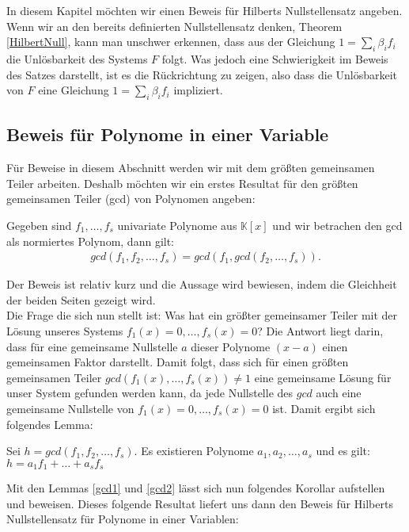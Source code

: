 In diesem Kapitel möchten wir einen Beweis für Hilberts Nullstellensatz angeben.
Wenn wir an den bereits definierten Nullstellensatz denken, Theorem \ref{HilbertNull}, kann man unschwer erkennen, dass aus der Gleichung $1 = \sum_i \beta_if_i$ die Unlösbarkeit des Systems $F$ folgt. Was jedoch eine Schwierigkeit im Beweis des Satzes darstellt, ist es die Rückrichtung zu zeigen, also dass die Unlösbarkeit von $F$ eine Gleichung $1 = \sum_i \beta_if_i$ impliziert.

\subsection{Beweis für Polynome in einer Variable}

Für Beweise in diesem Abschnitt werden wir mit dem größten gemeinsamen Teiler arbeiten. Deshalb möchten wir ein erstes Resultat für den größten gemeinsamen Teiler (gcd) von Polynomen angeben:
\begin{lemma} \label{gcd1}
Gegeben sind $f_1,\ldots ,f_s$ univariate Polynome aus $\mathbb{K}[x]$ und wir betrachen den gcd als normiertes Polynom, dann gilt:
\begin{align*}
gcd (f_1,f_2,\ldots,f_s) = gcd(f_1,gcd(f_2,\ldots,f_s)).
\end{align*}
\end{lemma}

\noindent Der Beweis ist relativ kurz und die Aussage wird bewiesen, indem die Gleichheit der beiden Seiten gezeigt wird.\\
\noindent Die Frage die sich nun stellt ist: Was hat ein größter gemeinsamer Teiler mit der Lösung unseres Systems $f_1(x)=0,\ldots,f_s(x)=0$? Die Antwort liegt darin, dass für eine gemeinsame Nullstelle $a$ dieser Polynome $(x-a)$ einen gemeinsamen Faktor darstellt. Damit folgt, dass sich für einen größten gemeinsamen Teiler $gcd(f_1(x),\ldots,f_s(x)) \not = 1$ eine gemeinsame Lösung für unser System gefunden werden kann, da jede Nullstelle des $gcd$ auch eine gemeinsame Nullstelle von $f_1(x)=0,\ldots,f_s(x)=0$ ist. Damit ergibt sich folgendes Lemma:

\begin{lemma} \label{gcd2}
Sei $h = gcd(f_1,f_2,\ldots,f_s)$. Es existieren Polynome $a_1,a_2,\ldots,a_s$ und es gilt: $h = a_1f_1+ \ldots + a_sf_s$
\end{lemma}

\noindent Mit den Lemmas \ref{gcd1} und \ref{gcd2} lässt sich nun folgendes Korollar aufstellen und beweisen. Dieses folgende Resultat liefert uns dann den Beweis für Hilberts Nullstellensatz für Polynome in einer Variablen:

